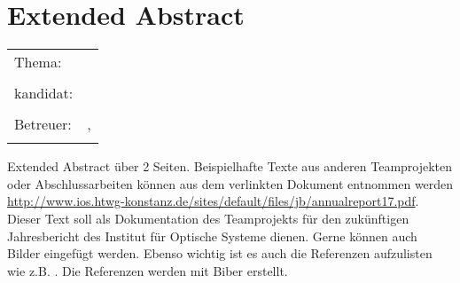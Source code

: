 \chapter*{Extended Abstract}

\begin{center}
	\begingroup
	\renewcommand*{\arraystretch}{1}
	{\makeatletter	
		\begin{tabular}{p{3.2cm}p{9.6cm}}
			Thema: & \thema \\
			& \\
			\type kandidat: & \verfasser \\
			& \\
			Betreuer: & \hoschschule \newline \institut \newline \prueferA, \prueferB \\
			& \\
		\end{tabular}
		
		\makeatother}
	\endgroup
\end{center}

\bigskip

\noindent
Extended Abstract über 2 Seiten. Beispielhafte Texte aus anderen Teamprojekten oder Abschlussarbeiten können aus dem verlinkten Dokument entnommen werden \href{http://www.ios.htwg-konstanz.de/sites/default/files/jb/annualreport17.pdf}{http://www.ios.htwg-konstanz.de/sites/default/files/jb/annualreport17.pdf}.\\

\noindent Dieser Text soll als Dokumentation des Teamprojekts für den zukünftigen Jahresbericht des Institut für Optische Systeme dienen. Gerne können auch Bilder eingefügt werden. Ebenso wichtig ist es auch die Referenzen aufzulisten wie z.B. \cite{Geim2001}. Die Referenzen werden mit Biber erstellt.


\printbibliography[title={Referenzen}, heading=subbibliography]